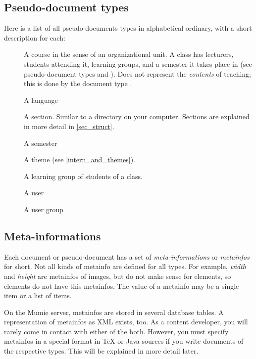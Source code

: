 \documentclass{generic}
\begin{document}
\subsection{Pseudo-document types}\label{pseudodoc_types}

Here is a list of all pseudo-documents types in alphabetical ordinary, with a
short description for each:

\begin{description}
\item[] A course in the sense of an organizational unit. A class
  has lecturers, students attending it, learning groups, and a semester it
  takes place in (see pseudo-document types  and
  ). Does not represent the \emph{contents} of teaching; this is
  done by the document type .
\item[] A language
\item[] A section. Similar to a directory on your
  computer. Sections are explained in more detail in \ref{sec_struct}.
\item[] A semester
\item[] A theme (see \ref{intern_and_themes}).
\item[] A learning group of students of a class.
\item[] A user
\item[] A user group
\end{description}

\subsection{Meta-informations}\label{metainfos}

Each document or pseudo-document has a set of \emph{meta-informations} or
\emph{metainfos } for short. Not all kinds of metainfo are defined for all
types. For example, \emph{width} and \emph{height} are metainfos of images, but
do not make sense for elements, so elements do not have this metainfos. The
value of a metainfo may be a single item or a list of items.

On the Mumie server, metainfos are stored in several database tables. A
representation of metainfos as XML exists, too. As a content developer, you
will rarely come in contact with either of the both. However, you must specify
metainfos in a special format in TeX or Java sources if you write documents of
the respective types. This will be explained in more detail later.
\end{document}
